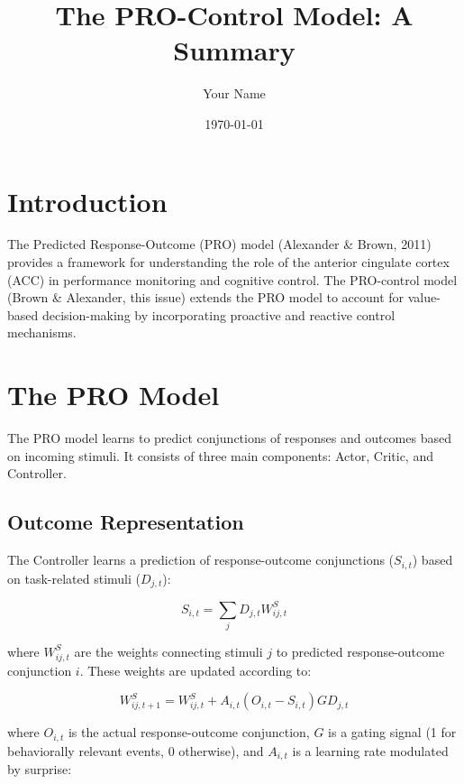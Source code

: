 
\usepackage{amsmath}

\title{The PRO-Control Model: A Summary}
\author{Your Name}
\date{\today}



\maketitle

\section{Introduction}

The Predicted Response-Outcome (PRO) model (Alexander \& Brown, 2011) provides a framework for understanding the role of the anterior cingulate cortex (ACC) in performance monitoring and cognitive control. The PRO-control model (Brown \& Alexander, this issue) extends the PRO model to account for value-based decision-making by incorporating proactive and reactive control mechanisms.

\section{The PRO Model}

The PRO model learns to predict conjunctions of responses and outcomes based on incoming stimuli.  It consists of three main components: Actor, Critic, and Controller.

\subsection{Outcome Representation}

The Controller learns a prediction of response-outcome conjunctions ($S_{i,t}$) based on task-related stimuli ($D_{j,t}$):

\begin{equation}
S_{i,t} = \sum_j D_{j,t} W^S_{ij,t}
\end{equation}

where $W^S_{ij,t}$ are the weights connecting stimuli $j$ to predicted response-outcome conjunction $i$.  These weights are updated according to:

\begin{equation}
W^S_{ij,t+1} = W^S_{ij,t} + A_{i,t}(O_{i,t} - S_{i,t})G D_{j,t}
\end{equation}

where $O_{i,t}$ is the actual response-outcome conjunction, $G$ is a gating signal (1 for behaviorally relevant events, 0 otherwise), and $A_{i,t}$ is a learning rate modulated by surprise:

